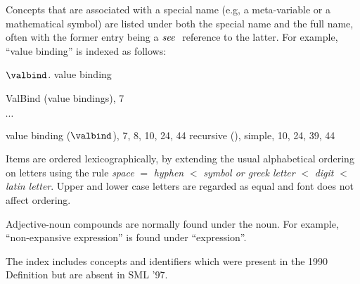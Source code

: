 \begin{theindex}
\thispagestyle{empty}
Concepts
 that are associated with a
special name (e.g, a meta-variable or a mathematical symbol)
are listed under both the special name and the full name,
often with the former entry being a ${\it see\ }$ reference to the latter.
For example, ``value binding'' is indexed as follows:
\indexspace

\item $\valbind$. \see value binding
\item ValBind (value bindings), 7
\item $\cdots$
\item value binding ($\valbind$), 7, 8, 10, 24, 44
\subitem recursive (), \recrefs
\subitem simple, 10, 24, 39, 44
\indexspace

Items are ordered lexicographically, by extending the
usual alphabetical ordering on letters using the rule
{\it space} $=$ {\it hyphen} $<$ {\it symbol or greek letter}  $<$ {\it digit} $<$ {\it latin letter}.
Upper and lower case letters are regarded as equal and font does not affect
ordering.

Adjective-noun compounds are normally found under the noun. For example,
``non-expansive expression'' is found under ``expression''.

The index includes concepts and identifiers
which were present in the 1990 Definition but are absent in SML '97.

\indexspace


\end{theindex}
